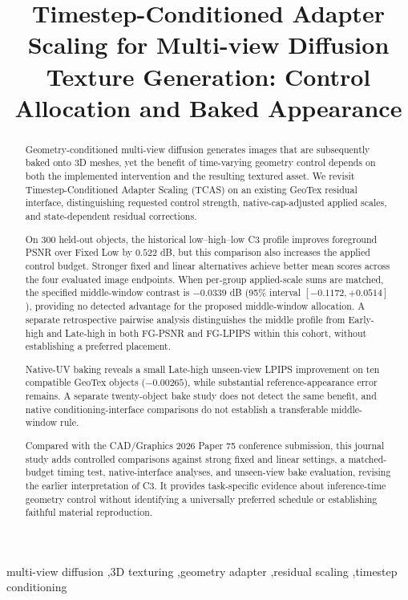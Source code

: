 \documentclass[times,twocolumn,final]{elsarticle}
\begin{document}
\begin{frontmatter}

\title{Timestep-Conditioned Adapter Scaling for Multi-view Diffusion Texture Generation: Control Allocation and Baked Appearance}


\begin{abstract}
Geometry-conditioned multi-view diffusion generates images that are subsequently baked onto 3D meshes, yet the benefit of time-varying geometry control depends on both the implemented intervention and the resulting textured asset. We revisit Timestep-Conditioned Adapter Scaling (TCAS) on an existing GeoTex residual interface, distinguishing requested control strength, native-cap-adjusted applied scales, and state-dependent residual corrections.

On 300 held-out objects, the historical low--high--low C3 profile improves foreground PSNR over Fixed Low by $0.522$ dB, but this comparison also increases the applied control budget. Stronger fixed and linear alternatives achieve better mean scores across the four evaluated image endpoints. When per-group applied-scale sums are matched, the specified middle-window contrast is $-0.0339$ dB (95\% interval $[-0.1172,+0.0514]$), providing no detected advantage for the proposed middle-window allocation. A separate retrospective pairwise analysis distinguishes the middle profile from Early-high and Late-high in both FG-PSNR and FG-LPIPS within this cohort, without establishing a preferred placement.

Native-UV baking reveals a small Late-high unseen-view LPIPS improvement on ten compatible GeoTex objects ($-0.00265$), while substantial reference-appearance error remains. A separate twenty-object bake study does not detect the same benefit, and native conditioning-interface comparisons do not establish a transferable middle-window rule.

Compared with the CAD/Graphics 2026 Paper 75 conference submission, this journal study adds controlled comparisons against strong fixed and linear settings, a matched-budget timing test, native-interface analyses, and unseen-view bake evaluation, revising the earlier interpretation of C3. It provides task-specific evidence about inference-time geometry control without identifying a universally preferred schedule or establishing faithful material reproduction.
\end{abstract}

\begin{keyword}
\KWD
multi-view diffusion \sep 3D texturing \sep geometry adapter \sep residual scaling \sep timestep conditioning
\end{keyword}

\end{frontmatter}
\end{document}
